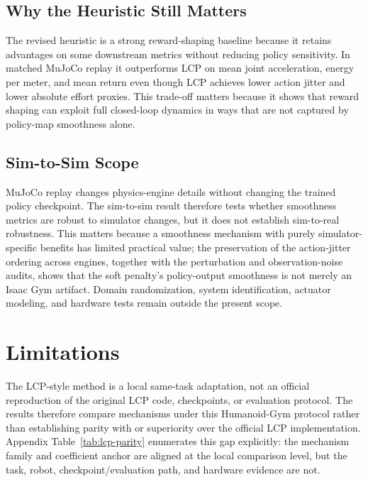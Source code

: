 \documentclass[10pt]{article}
\begin{document}
\subsection{Why the Heuristic Still Matters}

The revised heuristic is a strong reward-shaping baseline because it retains
advantages on some
downstream metrics without reducing policy sensitivity. In matched MuJoCo
replay it outperforms LCP on mean joint acceleration, energy per meter, and
mean return even though LCP achieves lower action jitter and lower absolute
effort proxies. This trade-off matters because it shows that reward shaping can
exploit full closed-loop dynamics in ways that are not captured by policy-map
smoothness alone.

\subsection{Sim-to-Sim Scope}

MuJoCo replay changes physics-engine details without changing the trained
policy checkpoint. The sim-to-sim result therefore tests whether smoothness
metrics are robust to simulator changes, but it does not establish sim-to-real
robustness. This matters because a smoothness mechanism with purely
simulator-specific benefits has limited practical value; the preservation of the
action-jitter ordering across engines, together with the perturbation and
observation-noise audits, shows that the soft penalty's policy-output
smoothness is not merely an Isaac Gym artifact. Domain randomization, system
identification, actuator modeling, and hardware tests remain outside the
present scope.

\section{Limitations}

The LCP-style method is a local same-task adaptation, not an official
reproduction of the original LCP code, checkpoints, or evaluation protocol. The
results therefore compare mechanisms under this Humanoid-Gym protocol rather
than establishing parity with or superiority over the official LCP
implementation. Appendix Table~\ref{tab:lcp-parity} enumerates this gap
explicitly: the mechanism family and coefficient anchor are aligned at the local
comparison level, but the task, robot, checkpoint/evaluation path, and hardware
evidence are not.
\end{document}
